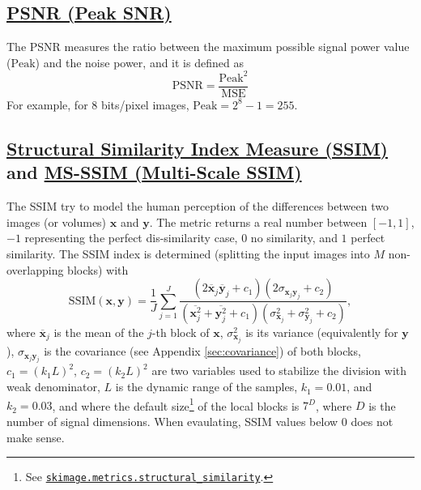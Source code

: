 \documentclass{article}
\begin{document}
\subsection{\href{https://en.wikipedia.org/wiki/Peak_signal-to-noise_ratio}{PSNR (Peak SNR)}}

The PSNR measures the ratio between the maximum possible signal power
value ($\text{Peak}$) and the noise power, and it is defined as
\begin{equation}
  \text{PSNR} = \frac{\text{Peak}^2}{\text{MSE}}
  \label{eq:PSNR}
\end{equation}
For example, for 8 bits/pixel images, $\text{Peak}=2^8-1=255$.


\subsection{\href{https://en.wikipedia.org/wiki/Structural_similarity_index_measure}{Structural
    Similarity Index Measure (SSIM)} and
  \href{https://en.wikipedia.org/wiki/Structural_similarity_index_measure\#Multi-scale_SSIM}{MS-SSIM
    (Multi-Scale SSIM)}}

The SSIM \cite{wang2004image} try to model the human perception of the
differences between two images (or volumes) $\mathbf{x}$ and
$\mathbf{y}$. The metric returns a real number between $[-1, 1]$, $-1$
representing the perfect dis-similarity case, $0$ no similarity, and
$1$ perfect similarity. The SSIM index is determined (splitting the
input images into $M$ non-overlapping blocks) with
\begin{equation}
  \text{SSIM}(\mathbf{x}, \mathbf{y}) = \frac{1}{J} \sum_{j=1}^J \frac{(2\overline{\mathbf{x}}_j \overline{\mathbf{y}}_j + c_1)(2\sigma_{\mathbf{x}_j \mathbf{y}_j} + c_2)}{(\overline{\mathbf{x}_j^2} + \overline{\mathbf{y}_j^2} + c_1)(\sigma^2_{\mathbf{x}_j} + \sigma^2_{\mathbf{y}_j} + c_2)},
\end{equation}
where $\overline{\mathbf x}_j$ is the mean of the $j$-th block of
$\mathbf{x}$, $\sigma^2_{\mathbf{x}_j}$ is its variance (equivalently
for $\mathbf{y}$), $\sigma_{\mathbf{x}_j\mathbf{y}_j}$ is the
covariance (see Appendix \ref{sec:covariance}) of both blocks, $c_1=(k_1L)^2$, $c_2=(k_2L)^2$ are two
variables used to stabilize the division with weak denominator, $L$ is
the dynamic range of the samples, $k_1=0.01$, and $k_2=0.03$, and
where the default
size\footnote{See \href{https://scikit-image.org/docs/stable/api/skimage.metrics.html\#skimage.metrics.structural_similarity}{\texttt{skimage.metrics.structural\_similarity}}.}
of the local blocks is $7^D$, where $D$ is the number of signal
dimensions. When evaulating, SSIM values below $0$ does not make
sense.
\end{document}
